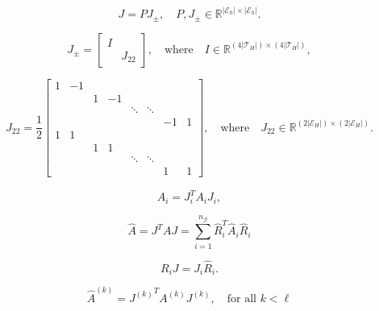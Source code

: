 \documentclass[11pt]{article}
\begin{document}
\begin{equation}\label{eq:transformation_J}
 J=P J_{\pm}, \quad P, J_{\pm} \in {\mathbb{R}}^{ |{\mathcal E}_h| \times  |{\mathcal E}_h| }.
\end{equation}

$$
J_{\pm}=\left[\begin{array}{cc}
    I& \\
    & J_{22}
    \end{array}\right],
\quad \mbox{where} \quad I \in {\mathbb{R}}^{(4 |{\mathcal{T}_H}|) \times (4 |{\mathcal{T}_H}|)},
$$

$$
J_{22}=\frac12 \left[\begin{array}{cccccccc}
    1 & -1 & & & & & & \\
    &  &  1 & -1 & & & & \\
    & & & &  \ddots & \ddots & & \\
    & & & & & & -1 & 1 \\
    1 & 1 & & & & & & \\
    &  &  1 & 1 & & & & \\
    & & & &  \ddots & \ddots & & \\
    & & & & & & 1 & 1 
    \end{array}\right],
\quad \mbox{where} \quad J_{22} \in {\mathbb{R}}^{(2|{\mathcal{E}_H}|) \times (2 |{\mathcal{E}_H}|)}.
$$

\begin{equation}\label{eq:A_i_hat}
\widehat{A}_i=J^T_i A_i J_i,
\end{equation}

\begin{equation}\label{eq:compatibility1}
 \widehat{A}=J^T A J = \sum_{i=1}^{n_{\mathcal G}} \widehat{R}_i^T \widehat{A}_i \widehat{R}_i
\end{equation}

\begin{equation}\label{eq:compatibility2}
 R_i J=J_i \widehat{R}_i.
\end{equation}

$$\widehat{A}^{(k)}={J^{(k)}}^T A^{(k)} J^{(k)}, \quad \mbox{for all } k<\ell$$
\end{document}
